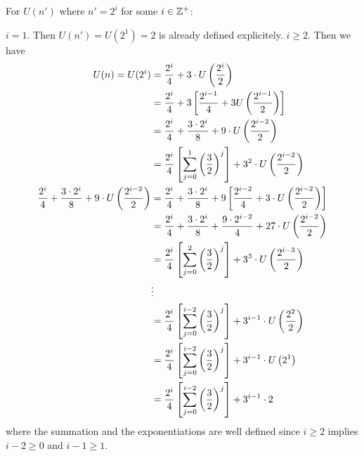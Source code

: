 \documentclass[11pt, sakura, night, 1in]{hw}
\begin{document}
For $U(n')$ where $n'=2^i$ for some $i\in\mathbb{Z}^+$:
\begin{proofcases}
    \case $i=1$. Then $U(n')=U(2^1)=2$ is already defined explicitely.
    \case $i\ge 2$. Then we have \begin{align*}
        U(n)=U(2^i) &= \frac{2^i}{4} + 3\cdot U\left(\frac{2^i}{2}\right)\\
        &=\frac{2^i}{4} + 3\left[\frac{2^{i-1}}{4} + 3 U\left(\frac{2^{i-1}}{2}\right)\right]\\
        &=\frac{2^i}{4} + \frac{3\cdot 2^i}{8} + 9\cdot U\left(\frac{2^{i-2}}{2}\right)\\
        &=\frac{2^i}{4}\left[\sum_{j=0}^1\left(\frac{3}{2}\right)^j\right] + 3^2\cdot U\left(\frac{2^{i-2}}{2}\right)\\
        \frac{2^i}{4} + \frac{3\cdot 2^i}{8} + 9\cdot U\left(\frac{2^{i-2}}{2}\right)&=\frac{2^i}{4} + \frac{3\cdot 2^i}{8} + 9\left[\frac{2^{i-2}}{4} + 3\cdot U\left(\frac{2^{i-2}}{2}\right)\right]\\
        &=\frac{2^i}{4} + \frac{3\cdot 2^i}{8} + \frac{9\cdot2^{i-2}}{4} + 27 \cdot U\left(\frac{2^{i-2}}{2}\right)\\
        &=\frac{2^i}{4}\left[\sum_{j=0}^2\left(\frac{3}{2}\right)^j\right] + 3^3\cdot U\left(\frac{2^{i-3}}{2}\right)\\
        &\vdots\\
        &=\frac{2^i}{4}\left[\sum_{j=0}^{i-2}\left(\frac{3}{2}\right)^j\right] + 3^{i-1}\cdot U\left(\frac{2^{2}}{2}\right)\\
        &=\frac{2^i}{4}\left[\sum_{j=0}^{i-2}\left(\frac{3}{2}\right)^j\right] + 3^{i-1}\cdot U\left(2^1\right)\\
        &=\frac{2^i}{4}\left[\sum_{j=0}^{i-2}\left(\frac{3}{2}\right)^j\right] + 3^{i-1}\cdot 2
    \end{align*}
    where the summation and the exponentiations are well defined since $i\ge 2$ implies $i-2\ge 0$ and $i-1\ge 1$. 
\end{proofcases}
\end{document}
